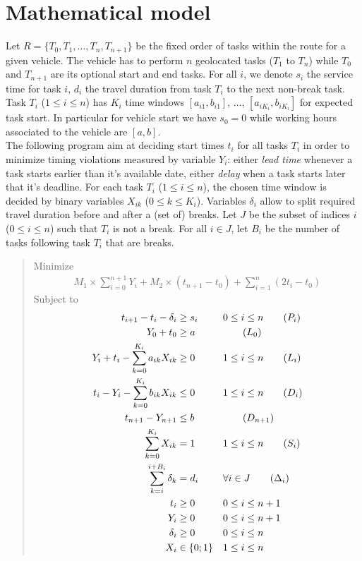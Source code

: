 \documentclass{article}
\begin{document}
\section{Mathematical model}

Let $R=\{T_0, T_1, \ldots, T_n, T_{n + 1}\}$ be the fixed order of
tasks within the route for a given vehicle. The vehicle has to perform
$n$ geolocated tasks ($T_1$ to $T_n$) while $T_0$ and $T_{n + 1}$ are
its optional start and end tasks. For all $i$, we denote $s_i$ the
service time for task $i$, $d_i$ the travel duration from task $T_i$
to the next non-break task. Task $T_i$ ($1\leq i \leq n$) has $K_i$
time windows $[a_{i1}, b_{i1}]$, $\dots$, $[a_{iK_i}, b_{iK_i}]$ for
expected task start. In particular for vehicle start we have $s_0 = 0$
while working hours associated to the vehicle are $[a, b]$.\\

The following program aim at deciding start times $t_i$ for all tasks
$T_i$ in order to minimize timing violations measured by variable
$Y_i$: either \textit{lead time} whenever a task starts earlier than
it's available date, either \textit{delay} when a task starts later
that it's deadline. For each task $T_i$ ($1\leq i\leq n$), the chosen
time window is decided by binary variables $X_{ik}$
($0\leq k \leq K_i$). Variables $\delta_i$ allow to split required
travel duration before and after a (set of) breaks. Let $J$ be the
subset of indices $i$ ($0\leq i \leq n$) such that $T_i$ is not a
break. For all $i\in J$, let $B_i$ be the number of tasks following
task $T_i$ that are breaks.

\begin{quote}
  Minimize
  \begin{align}
    M_1 \times \sum_{i = 0}^{n + 1} Y_i + M_2 \times (t_{n +1} - t_0) + \sum_{i = 1}^{n}(2t_i - t_0) \label{obj}\tag{Obj}
  \end{align}
  Subject to
  \begin{align}
    t_{i + 1} - t_i - \delta_i &\geq s_i && 0 \leq i \leq n\label{precedence}\tag{$P_i$}\\
    Y_0 + t_0 &\geq a &&  \label{lead_start}\tag{$L_0$}\\
    Y_i + t_i - \sum_{k = 0}^{K_i}a_{ik}X_{ik}&\geq 0 && 1 \leq i \leq n \label{lead}\tag{$L_i$}\\
    t_i - Y_i - \sum_{k = 0}^{K_i}b_{ik}X_{ik} &\leq 0 && 1 \leq i \leq n \label{delay}\tag{$D_i$}\\
    t_{n + 1} - Y_{n + 1} &\leq b && \label{delay_end}\tag{$D_{n + 1}$}\\
    \sum_{k = 0}^{K_i}X_{ik} &= 1 && 1 \leq i \leq n \label{tw_sum}\tag{$S_i$}\\
    \sum_{k = i}^{i + B_i}\delta_k &= d_i && \forall i\in J \label{break_duration}\tag{$\Delta_i$}\\
    t_i &\geq 0 && 0 \leq i \leq n + 1 \nonumber\\
    Y_i &\geq 0 && 0 \leq i \leq n + 1 \nonumber\\
    \delta_i &\geq 0 && 0 \leq i \leq n \nonumber\\
    X_i &\in \{0; 1\} && 1 \leq i \leq n \nonumber
  \end{align}
\end{quote}
\end{document}
